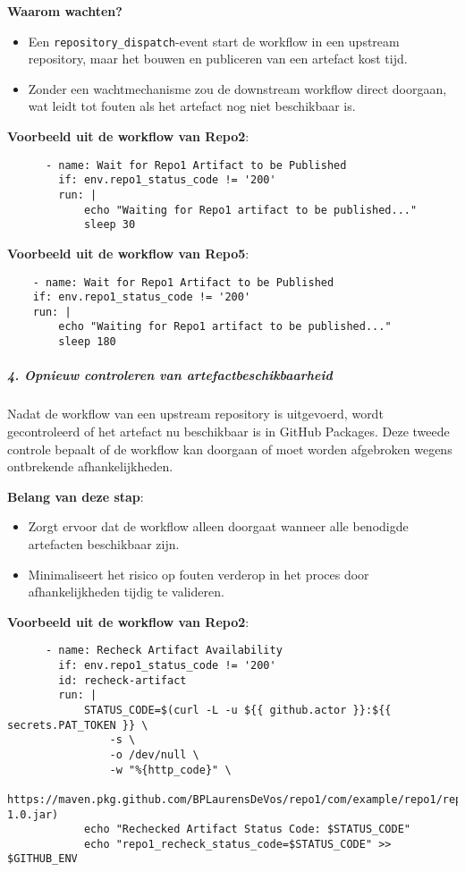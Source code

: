 \textbf{Waarom wachten?}

\begin{itemize} 
    \item Een \texttt{repository\_dispatch}-event start de workflow in een upstream repository, maar het bouwen en publiceren van een artefact kost tijd. 
    \item Zonder een wachtmechanisme zou de downstream workflow direct doorgaan, wat leidt tot fouten als het artefact nog niet beschikbaar is. 
\end{itemize}

\textbf{Voorbeeld uit de workflow van Repo2}:

\begin{verbatim}
      - name: Wait for Repo1 Artifact to be Published
        if: env.repo1_status_code != '200'
        run: |
            echo "Waiting for Repo1 artifact to be published..."
            sleep 30
\end{verbatim}

\textbf{Voorbeeld uit de workflow van Repo5}:

\begin{verbatim}
    - name: Wait for Repo1 Artifact to be Published
    if: env.repo1_status_code != '200'
    run: |
        echo "Waiting for Repo1 artifact to be published..."
        sleep 180
\end{verbatim}

\subparagraph{4. Opnieuw controleren van artefactbeschikbaarheid}
Nadat de workflow van een upstream repository is uitgevoerd, wordt gecontroleerd of het artefact nu beschikbaar is in GitHub Packages. Deze tweede controle bepaalt of de workflow kan doorgaan of moet worden afgebroken wegens ontbrekende afhankelijkheden.

\textbf{Belang van deze stap}:

\begin{itemize} 
    \item Zorgt ervoor dat de workflow alleen doorgaat wanneer alle benodigde artefacten beschikbaar zijn. 
    \item Minimaliseert het risico op fouten verderop in het proces door afhankelijkheden tijdig te valideren. 
\end{itemize}

\textbf{Voorbeeld uit de workflow van Repo2}:

\begin{verbatim}
      - name: Recheck Artifact Availability
        if: env.repo1_status_code != '200'
        id: recheck-artifact
        run: |
            STATUS_CODE=$(curl -L -u ${{ github.actor }}:${{        secrets.PAT_TOKEN }} \
                -s \
                -o /dev/null \
                -w "%{http_code}" \
                https://maven.pkg.github.com/BPLaurensDeVos/repo1/com/example/repo1/repo1/1.0/repo1-1.0.jar)
            echo "Rechecked Artifact Status Code: $STATUS_CODE"
            echo "repo1_recheck_status_code=$STATUS_CODE" >> $GITHUB_ENV
\end{verbatim}

